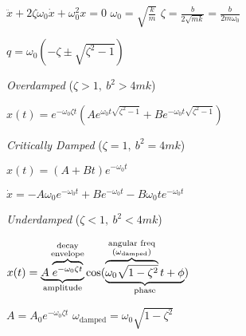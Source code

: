 \documentclass[twocolumn]{article}
\begin{document}
$\ddot{x} + 2\zeta \omega_0 \dot{x} + \omega_0^2x = 0$ \hfill $\omega_0 = \sqrt{\frac{k}{m}}$ \hfill $\zeta = \frac{b}{2\sqrt{mk}} = \frac{b}{2m\omega_0}$

$q = \omega_0 \left(-\zeta \pm \sqrt{\zeta^2 - 1} \right)$

\textit{Overdamped} ($\zeta > 1,\ b^2 > 4mk$)
\vspace{-1em}
\begin{center}
	$x(t) = e^{-\omega_0 \zeta t} \left( Ae^{\omega_0 t \sqrt{\zeta^2-1}} + Be^{-\omega_0 t \sqrt{\zeta^2-1}} \right)$
\end{center} \vspace{-1em}

\textit{Critically Damped} ($\zeta = 1,\ b^2 = 4mk$)
\vspace{-1em}
\begin{center}
	 $x(t) = (A + Bt) e^{-\omega_0 t}$
	 
	 $\dot{x} = -A \omega_0 e^{-\omega_0 t} + Be^{-\omega_0 t} - B \omega_0 t e^{-\omega_0 t}$
\end{center} \vspace{-1em}

\textit{Underdamped} ($\zeta < 1,\ b^2 < 4mk$)
\vspace{-1em}
\begin{center}
	$x(t) = \underbrace{ A \overbrace{e^{-\omega_0 \zeta t}}^{ \begin{subarray}{c}\text{decay}\\ \text{envelope}\end{subarray} } }_\text{amplitude}
	\cos ( \underbrace{\overbrace{\omega_0 \sqrt{1 - \zeta^2}}^{ \begin{subarray}{c}\text{angular freq}\\ \text{($\omega_{\text{damped}}$)}\end{subarray} } t + \phi}_\text{phase} )$
	
	\hspace{2em} $A = A_0 e^{-\omega_0 \zeta t}$ \hspace{2.25em} $\omega_{\text{damped}} = \omega_0 \sqrt{1-\zeta^2}$
\end{center} \vspace{-1em}
\end{document}
